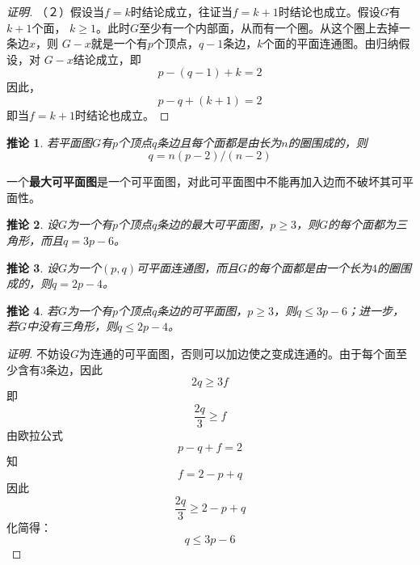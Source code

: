 \documentclass{article}
\newtheorem{Cor}{推论}
\begin{document}
\begin{CJK*}{UTF8}{gbsn}
\begin{proof}[证明]
  （２）假设当$f=k$时结论成立，往证当$f=k+1$时结论也成立。假设$G$有$k+1$个面，
  $k\geq 1$。此时$G$至少有一个内部面，从而有一个圈。从这个圈上去掉一条边$x$，则
  $G-x$就是一个有$p$个顶点，$q-1$条边，$k$个面的平面连通图。由归纳假设，对
  $G-x$结论成立，即\[p-(q-1) + k =2\]
  因此，\[p-q+ (k+1) =2\]
  即当$f=k+1$时结论也成立。
\end{proof}
 \begin{Cor}
    若平面图$G$有$p$个顶点$q$条边且每个面都是由长为$n$的圈围成的，则
    \begin{equation*}
      q = n(p-2)/(n-2)
    \end{equation*}
  \end{Cor}
一个{\bfseries 最大可平面图}是一个可平面图，对此可平面图中不能再加入边而不破坏其可平面性。
  \begin{Cor}
    设$G$为一个有$p$个顶点$q$条边的最大可平面图，$p \geq 3$，则$G$的每个面都为三角形，而且$q=3p-6$。
  \end{Cor}
  \begin{Cor}
    设$G$为一个$(p,q)$可平面连通图，而且$G$的每个面都是由一个长为$4$的圈围成的，则$q=2p-4$。
  \end{Cor}
  \begin{Cor}
    若$G$为一个有$p$个顶点$q$条边的可平面图，$p\geq 3$，则$q \leq 3p - 6$；进一步，若$G$中没有三角形，则$q \leq 2p -4$。
  \end{Cor}
     \centering
 \begin{proof}[证明]
  不妨设$G$为连通的可平面图，否则可以加边使之变成连通的。由于每个面至少含有3条边，因此
  \[2q \geq 3f\]
  即
  \[\frac{2q}{3} \geq f\]
  由欧拉公式
  \[p - q + f = 2\]
  知
  \[f=2-p+q\]
  因此
  \[\frac{2q}{3} \geq 2-p+q\]
  化简得：
  \[q \leq 3p - 6\]


\end{proof}
\end{CJK*}
\end{document}
